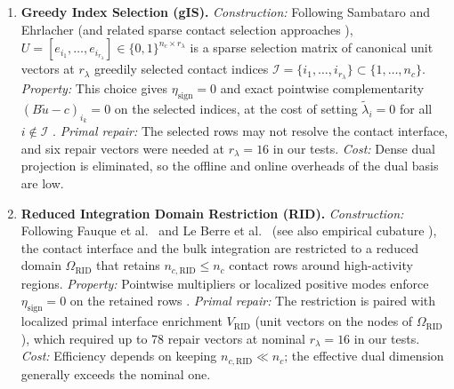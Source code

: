 \documentclass[11pt,a4paper]{article}
\begin{document}
\begin{enumerate}
  \emph{Property:} The columns are positively scaled physical snapshots, so \(\eta_{\text{sign}} = 0\) holds identically without an iterative NMF optimization.
  \emph{Primal repair:} Linear independence of the columns can degrade as \(r_\lambda\) grows \cite{benaceur2020reduced}, which can require additional primal enrichment.
  \emph{Cost:} The offline cost is moderate (a greedy non-negative least-squares search).
\item
  \textbf{Greedy Index Selection (gIS).}
  \emph{Construction:} Following Sambataro and Ehrlacher \cite{sambataro2026model} (and related sparse contact selection approaches \cite{kollepara2024sparse}), \(U = [e_{i_1}, \dots, e_{i_{r_\lambda}}] \in \{0, 1\}^{n_c \times r_\lambda}\) is a sparse selection matrix of canonical unit vectors at \(r_\lambda\) greedily selected contact indices \(\mathcal{I} = \{i_1, \dots, i_{r_\lambda}\} \subset \{1, \dots, n_c\}\).
  \emph{Property:} This choice gives \(\eta_{\text{sign}} = 0\) and exact pointwise complementarity \((B \tilde{u} - c)_{i_k} = 0\) on the selected indices, at the cost of setting \(\tilde{\lambda}_i = 0\) for all \(i \notin \mathcal{I}\) \cite{sambataro2026model}.
  \emph{Primal repair:} The selected rows may not resolve the contact interface, and six repair vectors were needed at \(r_\lambda = 16\) in our tests.
  \emph{Cost:} Dense dual projection is eliminated, so the offline and online overheads of the dual basis are low.
\item
  \textbf{Reduced Integration Domain Restriction (RID).}
  \emph{Construction:} Following Fauque et al.~\cite{fauque2018hybrid} and Le Berre et al.~\cite{leberre2022condition} (see also empirical cubature \cite{koller2021hyper, aresdeparga2023petrov}), the contact interface and the bulk integration are restricted to a reduced domain \(\Omega_{\text{RID}}\) that retains \(n_{c,\text{RID}} \le n_c\) contact rows around high-activity regions.
  \emph{Property:} Pointwise multipliers or localized positive modes enforce \(\eta_{\text{sign}} = 0\) on the retained rows \cite{fauque2018hybrid, leberre2022condition}.
  \emph{Primal repair:} The restriction is paired with localized primal interface enrichment \(V_{\text{RID}}\) (unit vectors on the nodes of \(\Omega_{\text{RID}}\)), which required up to 78 repair vectors at nominal \(r_\lambda = 16\) in our tests.
  \emph{Cost:} Efficiency depends on keeping \(n_{c,\text{RID}} \ll n_c\); the effective dual dimension generally exceeds the nominal one.
\end{enumerate}
\end{document}
